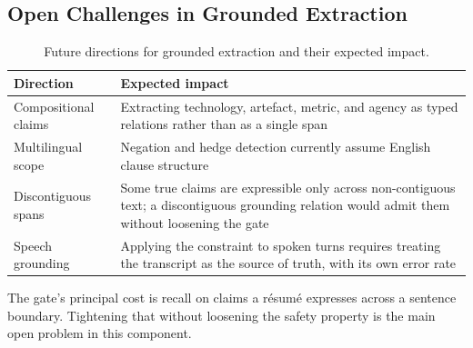 \subsection{Open Challenges in Grounded Extraction}

\begin{table}[t]
\caption{Future directions for grounded extraction and their expected impact.}
\label{tab:grounding-future}
\small
\begin{tabular}{@{}p{2.2cm}p{5.2cm}@{}}
\toprule
Direction & Expected impact \\
\midrule
Compositional claims & Extracting technology, artefact, metric, and agency as
typed relations rather than as a single span \\
Multilingual scope & Negation and hedge detection currently assume English clause
structure \\
Discontiguous spans & Some true claims are expressible only across
non-contiguous text; a discontiguous grounding relation would admit them without
loosening the gate \\
Speech grounding & Applying the constraint to spoken turns requires treating the
transcript as the source of truth, with its own error rate \\
\bottomrule
\end{tabular}
\end{table}

The gate's principal cost is recall on claims a résumé expresses across a
sentence boundary. Tightening that without loosening the safety property is the
main open problem in this component.
